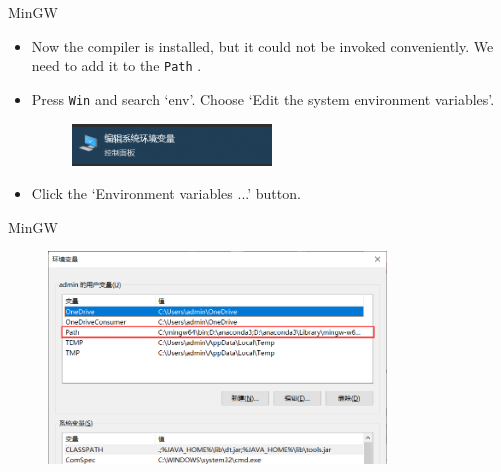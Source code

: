 \documentclass[handout]{beamer}
\begin{document}
\begin{frame}{MinGW}
    \begin{itemize}
        \item Now the compiler is installed, but it could not be invoked conveniently. We need to add it to the \texttt{Path} .
        \item Press \texttt{Win} and search `env'. Choose `Edit the system environment variables'.
        \begin{figure}[h]
            \centering
            \includegraphics[width=0.5\textwidth]{img/start_env.png}
        \end{figure}
        \item Click the `Environment variables ...' button.
    \end{itemize}
\end{frame}

\begin{frame}{MinGW}
    \begin{figure}[h]
        \centering
        \includegraphics[width=0.8\textwidth]{img/env_var.png}
    \end{figure}
\end{frame}
\end{document}

